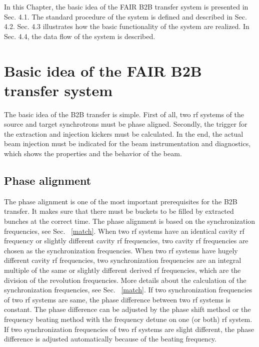 

In this Chapter, the basic idea of the FAIR B2B transfer system is presented in Sec. 4.1. The standard procedure of the system is defined and described in Sec. 4.2. Sec. 4.3 illustrates how the basic functionality of the system are realized. In Sec. 4.4, the data flow of the system is described. 

\section{Basic idea of the FAIR B2B transfer system} 
The basic idea of the B2B transfer is simple. First of all, two rf systems of the source and target synchrotrons must be phase aligned. Secondly, the trigger for the extraction and injection kickers must be calculated. In the end, the actual beam injection must be indicated for the beam instrumentation and diagnostics, which shows the properties and the behavior of the beam. 

\subsection{Phase alignment}
The phase alignment is one of the most important prerequisites for the B2B transfer. It makes sure that there must be buckets to be filled by extracted bunches at the correct time. The phase alignment is based on the synchronization frequencies, see Sec. ~\ref{match}. When two rf systems have an identical cavity rf frequency or slightly different cavity rf frequencies, two cavity rf frequencies are chosen as the synchronization frequencies. When two rf systems have hugely different cavity rf frequencies, two synchronization frequencies are an integral multiple of the same or slightly different derived rf frequencies, which are the division of the revolution frequencies. More details about the calculation of the synchronization frequencies, see Sec. ~\ref{match}. If two synchronization frequencies of two rf systems are same, the phase difference between two rf systems is constant. The phase difference can be adjusted by the phase shift method or the frequency beating method with the frequency detune on one (or both) rf system. If two synchronization frequencies of two rf systems are slight different, the phase difference is adjusted automatically because of the beating frequency. %


